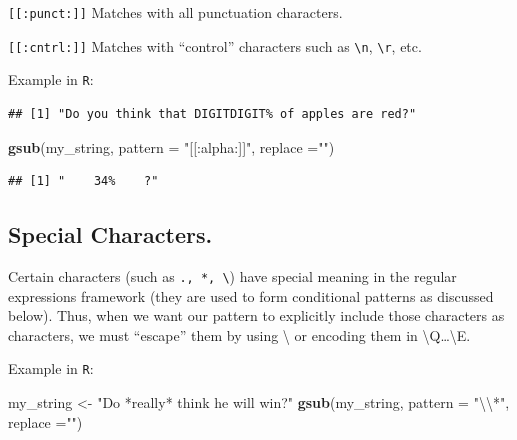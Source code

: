 \documentclass[]{book}
\newenvironment{Shaded}{\begin{snugshade}}{\end{snugshade}}
\newcommand{\CharTok}[1]{\textcolor[rgb]{0.31,0.60,0.02}{#1}}
\newcommand{\DataTypeTok}[1]{\textcolor[rgb]{0.13,0.29,0.53}{#1}}
\newcommand{\KeywordTok}[1]{\textcolor[rgb]{0.13,0.29,0.53}{\textbf{#1}}}
\newcommand{\NormalTok}[1]{#1}
\newcommand{\StringTok}[1]{\textcolor[rgb]{0.31,0.60,0.02}{#1}}
\theoremstyle{definition}
\theoremstyle{definition}
\theoremstyle{definition}
\theoremstyle{remark}
\begin{document}
\begin{Shaded}
\begin{Highlighting}[]
\begin{Shaded}
\begin{Highlighting}[]
\begin{Shaded}
\begin{Highlighting}[]
\texttt{{[}{[}:punct:{]}{]}} Matches with all punctuation characters.

\texttt{{[}{[}:cntrl:{]}{]}} Matches with ``control'' characters such as \texttt{\textbackslash{}n}, \texttt{\textbackslash{}r}, etc.

Example in \texttt{R}:

\begin{Shaded}
\end{Shaded}

\begin{verbatim}
## [1] "Do you think that DIGITDIGIT% of apples are red?"
\end{verbatim}

\begin{Shaded}
\begin{Highlighting}[]
\KeywordTok{gsub}\NormalTok{(my_string, }\DataTypeTok{pattern =} \StringTok{"[[:alpha:]]"}\NormalTok{, }\DataTypeTok{replace =}\StringTok{""}\NormalTok{)}
\end{Highlighting}
\end{Shaded}

\begin{verbatim}
## [1] "    34%    ?"
\end{verbatim}

\hypertarget{special-characters.}{%
\subsection{Special Characters.}\label{special-characters.}}

Certain characters (such as \texttt{.,\ *,\ \textbackslash{}}) have special meaning in the regular expressions framework (they are used to form conditional patterns as discussed below). Thus, when we want our pattern to explicitly include those characters as characters, we must ``escape'' them by using \textbackslash{} or encoding them in \textbackslash{}Q\ldots{}\textbackslash{}E.

Example in \texttt{R}:

\begin{Shaded}
\begin{Highlighting}[]
\NormalTok{my_string <-}\StringTok{ "Do *really* think he will win?"}
\KeywordTok{gsub}\NormalTok{(my_string, }\DataTypeTok{pattern =} \StringTok{"}\CharTok{\textbackslash{}\textbackslash{}}\StringTok{*"}\NormalTok{, }\DataTypeTok{replace =}\StringTok{""}\NormalTok{)}
\end{Highlighting}
\end{Shaded}


\end{Highlighting}
\end{Shaded}
\end{Highlighting}
\end{Shaded}
\end{Highlighting}
\end{Shaded}
\end{document}
